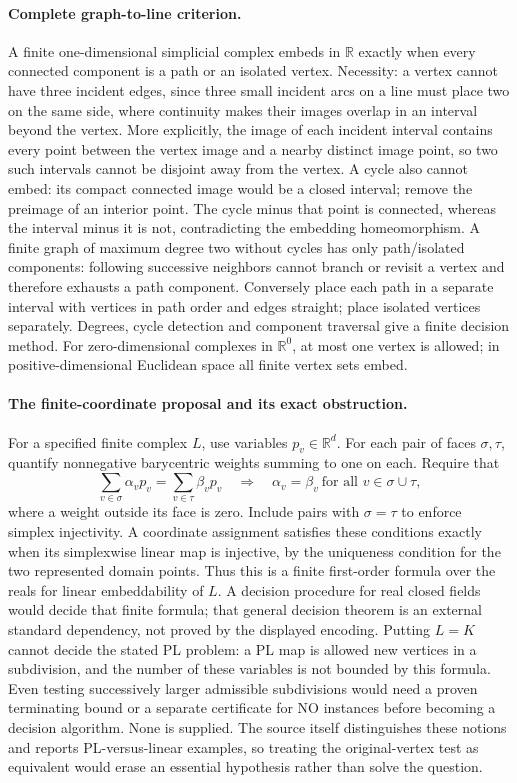 \documentclass[11pt]{article}
\begin{document}
\paragraph{Complete graph-to-line criterion.}
A finite one-dimensional simplicial complex embeds in $\mathbb R$ exactly
when every connected component is a path or an isolated vertex. Necessity:
a vertex cannot have three incident edges, since three small incident arcs
on a line must place two on the same side, where continuity makes their
images overlap in an interval beyond the vertex. More explicitly, the image
of each incident interval contains every point between the vertex image
and a nearby distinct image point, so two such intervals cannot be disjoint
away from the vertex. A cycle also cannot embed: its compact connected image
would be a closed interval; remove the preimage of an interior point. The
cycle minus that point is connected, whereas the interval minus it is not,
contradicting the embedding homeomorphism. A finite graph of maximum degree
two without cycles has only path/isolated components: following successive
neighbors cannot branch or revisit a vertex and therefore exhausts a path
component. Conversely place each path in a separate interval with vertices
in path order and edges straight; place isolated vertices separately.
Degrees, cycle detection and component traversal give a finite decision method.
For zero-dimensional complexes in $\mathbb R^0$, at most one vertex is
allowed; in positive-dimensional Euclidean space all finite vertex sets embed.

\paragraph{The finite-coordinate proposal and its exact obstruction.}
For a specified finite complex $L$, use variables $p_v\in\mathbb R^d$.
For each pair of faces $\sigma,\tau$, quantify nonnegative barycentric
weights summing to one on each. Require that
\[
\sum_{v\in\sigma}\alpha_vp_v=\sum_{v\in\tau}\beta_vp_v
\quad\Longrightarrow\quad
\alpha_v=\beta_v\ \text{for all }v\in\sigma\cup\tau,
\]
where a weight outside its face is zero. Include pairs with $\sigma=\tau$
to enforce simplex injectivity. A coordinate assignment satisfies these
conditions exactly when its simplexwise linear map is injective, by the
uniqueness condition for the two represented domain points. Thus this is a
finite first-order formula over the reals for linear embeddability of $L$.
A decision procedure for real closed fields would decide that finite formula;
that general decision theorem is an external standard dependency, not proved
by the displayed encoding.
Putting $L=K$ cannot decide the stated PL problem: a PL map is allowed
new vertices in a subdivision, and the number of these variables is not
bounded by this formula. Even testing successively larger admissible
subdivisions would need a proven terminating bound or a separate certificate
for NO instances before becoming a decision algorithm. None is supplied.
The source itself distinguishes these notions and reports PL-versus-linear
examples, so treating the original-vertex test as equivalent would erase
an essential hypothesis rather than solve the question.
\end{document}
